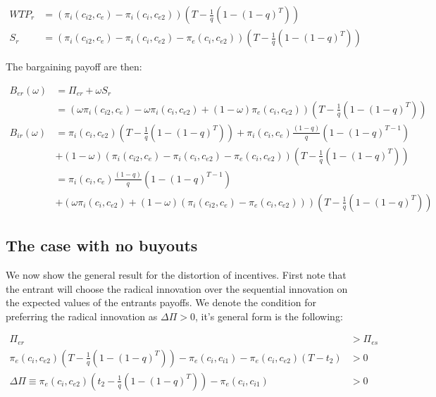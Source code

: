 \begin{align*}
WTP_r &= (\pi_{i}(c_{i2},c_{e})-\pi_{i}(c_{i},c_{e2})) \left( T- \frac{1}{q} \left( 1-(1-q)^{T} \right) \right) \\
S_r &= (\pi_{i}(c_{i2},c_{e})-\pi_{i}(c_{i},c_{e2})-\pi_{e}(c_{i},c_{e2})) \left( T - \frac{1}{q} \left( 1-(1-q)^{T} \right) \right)
\end{align*}

The bargaining payoff are then:

\begin{align*}
B_{er}(\omega) &= \Pi_{er}+\omega S_r \\
&= \left(\omega\pi_{i}(c_{i2},c_{e})-\omega \pi_{i}(c_{i},c_{e2})+(1-\omega)\pi_{e}(c_{i},c_{e2}) \right) \left( T - \frac{1}{q} \left( 1-(1-q)^{T} \right) \right) \\
B_{ir}(\omega) &=\pi_{i}(c_i,c_{e2}) \left( T - \frac{1}{q} \left( 1-(1-q)^{T} \right) \right)
+\pi_i(c_i,c_e) \frac{(1-q)}{q} \left( 1-(1-q)^{T-1} \right)
\\ &+(1-\omega)(\pi_{i}(c_{i2},c_{e})-\pi_{i}(c_{i},c_{e2})-\pi_{e}(c_{i},c_{e2})) \left( T- \frac{1}{q} \left( 1-(1-q)^{T} \right) \right) \\
&=\pi_i(c_i,c_e) \frac{(1-q)}{q} \left( 1-(1-q)^{T-1} \right)
\\ &+(\omega \pi_i(c_i,c_{e2})+(1-\omega)(\pi_{i}(c_{i2},c_{e})-\pi_{e}(c_{i},c_{e2}))) \left( T - \frac{1}{q} \left( 1-(1-q)^{T} \right) \right)
\end{align*}

\subsection{The case with no buyouts}

We now show the general result for the distortion of incentives. First note that the entrant will choose the radical innovation over the sequential innovation on the expected values of the entrants payoffs. We denote the condition for preferring the radical innovation as $\Delta \Pi >0$, it's general form is the following: 

\begin{align*}
\Pi_{er}  &> \Pi_{es}   \\
\pi_{e}(c_i,c_{e2}) \left( T - \frac{1}{q} \left( 1-(1-q)^{T} \right) \right) - \pi_e(c_i,c_{i1})  -\pi_e(c_i,c_{e2})(T-t_2) &> 0 \\
\Delta \Pi \equiv \pi_{e}(c_i,c_{e2}) \left( t_2 - \frac{1}{q} \left( 1-(1-q)^{T} \right) \right) - \pi_e(c_i,c_{i1})  &> 0 \\
\end{align*}

